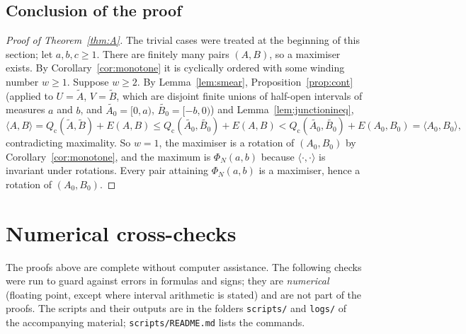 \documentclass[11pt]{amsart}
\theoremstyle{definition}
\theoremstyle{remark}
\newcommand{\ip}[2]{\langle #1,#2\rangle}
\newcommand{\Qc}{Q_{\mathrm{c}}}
\begin{document}
\subsection{Conclusion of the proof}
\begin{proof}[Proof of Theorem~\ref{thm:A}]
The trivial cases were treated at the beginning of this section; let $a,b,c\ge1$. There are finitely many pairs
$(A,B)$, so a maximiser exists. By Corollary~\ref{cor:monotone} it is cyclically ordered with some winding number
$w\ge1$. Suppose $w\ge2$. By Lemma~\ref{lem:smear}, Proposition~\ref{prop:cont} (applied to $U=\widetilde A$,
$V=\widetilde B$, which are disjoint finite unions of half-open intervals of measures $a$ and $b$, and
$\widetilde{A_0}=[0,a)$, $\widetilde{B_0}=[-b,0)$) and Lemma~\ref{lem:junctionineq},
\[
\ip AB=\Qc(\widetilde A,\widetilde B)+E(A,B)\le\Qc(\widetilde{A_0},\widetilde{B_0})+E(A,B)
<\Qc(\widetilde{A_0},\widetilde{B_0})+E(A_0,B_0)=\ip{A_0}{B_0},
\]
contradicting maximality. So $w=1$, the maximiser is a rotation of $(A_0,B_0)$ by Corollary~\ref{cor:monotone},
and the maximum is $\Phi_N(a,b)$ because $\ip{\cdot}{\cdot}$ is invariant under rotations. Every pair attaining
$\Phi_N(a,b)$ is a maximiser, hence a rotation of $(A_0,B_0)$.
\end{proof}

\section{Numerical cross-checks}\label{sec:numerics}

The proofs above are complete without computer assistance. The following checks were run to guard against
errors in formulas and signs; they are \emph{numerical} (floating point, except where interval arithmetic is
stated) and are not part of the proofs. The scripts and their outputs are in the folders \texttt{scripts/} and
\texttt{logs/} of the accompanying material; \texttt{scripts/README.md} lists the commands.
\end{document}
